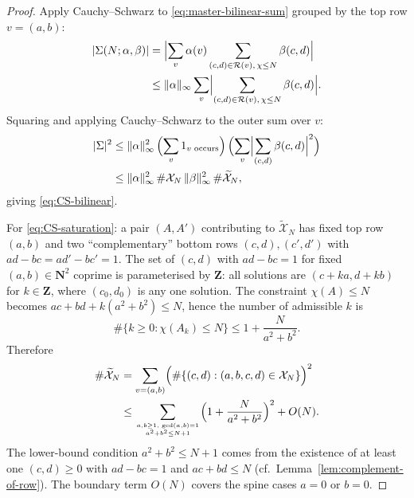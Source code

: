 \documentclass[11pt]{article}
\theoremstyle{definition}
\newcommand{\N}{\mathbf{N}}
\newcommand{\Z}{\mathbf{Z}}
\begin{document}
\begin{proof}
Apply Cauchy--Schwarz to \eqref{eq:master-bilinear-sum} grouped by the
top row $v=(a,b)$:
\begin{align*}
|\Sigma(N;\alpha,\beta)|
&=\Bigl|\sum_{v}\alpha(v)\sum_{(c,d)\in\mathcal{R}(v),\,\chi\le N}\beta(c,d)\Bigr|\\
&\le \|\alpha\|_{\infty}\sum_{v}\Bigl|\sum_{(c,d)\in\mathcal{R}(v),\,\chi\le N}\beta(c,d)\Bigr|.
\end{align*}
Squaring and applying Cauchy--Schwarz to the outer sum over $v$:
\begin{align*}
|\Sigma|^{2}
&\le\|\alpha\|_{\infty}^{2}\,
\Bigl(\sum_{v}1_{v\text{ occurs}}\Bigr)\,
\Bigl(\sum_{v}\Bigl|\sum_{(c,d)}\beta(c,d)\Bigr|^{2}\Bigr)\\
&\le\|\alpha\|_{\infty}^{2}\,\#\mathcal{X}_{N}\,
\|\beta\|_{\infty}^{2}\,\#\widetilde{\mathcal{X}}_{N},
\end{align*}
giving \eqref{eq:CS-bilinear}.

For \eqref{eq:CS-saturation}: a pair $(A,A')$ contributing to
$\widetilde{\mathcal{X}}_{N}$ has fixed top row $(a,b)$ and two
``complementary'' bottom rows $(c,d),(c',d')$ with
$ad-bc=ad'-bc'=1$. The set of $(c,d)$ with $ad-bc=1$ for fixed
$(a,b)\in\N^{2}$ coprime is parameterised by $\Z$: all solutions are
$(c+ka,d+kb)$ for $k\in\Z$, where $(c_{0},d_{0})$ is any one solution.
The constraint $\chi(A)\le N$ becomes
$ac+bd+k(a^{2}+b^{2})\le N$, hence the number of admissible $k$ is
\begin{equation}\label{eq:k-count}
\#\{k\ge 0:\chi(A_{k})\le N\}\le 1+\frac{N}{a^{2}+b^{2}}.
\end{equation}
Therefore
\begin{align*}
\#\widetilde{\mathcal{X}}_{N}
&=\sum_{v=(a,b)}\Bigl(\#\{(c,d):(a,b,c,d)\in\mathcal{X}_{N}\}\Bigr)^{2}\\
&\le\sum_{a,b\ge 1,\;\gcd(a,b)=1\atop a^{2}+b^{2}\le N+1}
\Bigl(1+\frac{N}{a^{2}+b^{2}}\Bigr)^{2}+O(N).
\end{align*}
The lower-bound condition $a^{2}+b^{2}\le N+1$ comes from the existence
of at least one $(c,d)\ge 0$ with $ad-bc=1$ and $ac+bd\le N$ (cf.\
Lemma~\ref{lem:complement-of-row}). The boundary term $O(N)$
covers the spine cases $a=0$ or $b=0$.


\end{proof}
\end{document}
